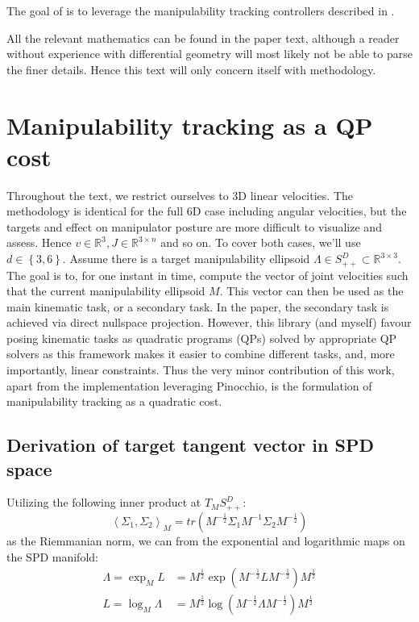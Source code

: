 \documentclass{article}
\begin{document}
The goal of is to leverage the manipulability tracking
controllers described in \cite{jaquier2018geometry}.

All the relevant mathematics can be found in the paper text, although a reader 
without experience with differential geometry
will most likely not be able to parse the finer details.
Hence this text will only concern itself with methodology.

\section{Manipulability tracking as a QP cost}
Throughout the text, we restrict ourselves to 3D linear velocities.
The methodology is identical for the full 6D case including angular velocities,
but the targets and effect on manipulator posture are more difficult to visualize and assess.
Hence $ v \in \mathbb{R}^{3}, J \in \mathbb{R}^{3 \times n}  $ and so on.
To cover both cases, we'll use $ d \in \left\{ 3,6 \right\}   $.
Assume there is a target manipulability ellipsoid $ \Lambda \in S^{ D }_{ ++ } \subset \mathbb{R}^{3 \times 3} $. 
The goal is to, for one instant in time, compute the vector of joint
velocities such that the current manipulability ellipsoid $ M  $.
This vector can then be used as the main kinematic task,
or a secondary task.
In the paper, the secondary task is achieved via direct nullspace projection.
However, this library (and myself) favour posing kinematic tasks
as quadratic programs (QPs) solved by appropriate QP solvers
as this framework makes it easier to combine different tasks,
and, more importantly, linear constraints.
Thus the very minor contribution of this work, apart from the implementation leveraging Pinocchio,
is the formulation of manipulability tracking as a quadratic cost.

\subsection{Derivation of target tangent vector in SPD space}
Utilizing the following inner product at $ T_{ M } S_{ ++ }^{ D }  $:
\begin{equation}
\left<\Sigma_{ 1 }, \Sigma_{ 2 } \right>_{ M }=
tr \left( 
M^{ -\frac{1}{2}  } \Sigma_{ 1 }
M^{ -1  } \Sigma_{ 2 }
M^{ -\frac{1}{2}  } 
\right) 
\end{equation}
as the Riemmanian norm, we can from the exponential and logarithmic maps
on the SPD manifold:
\begin{align}
\Lambda = \exp_{ M } L &=
M^{ \frac{1}{2}  } \exp (M^{ -\frac{1}{2}  }L M^{ -\frac{1}{2}  })M^{ \frac{1}{2}  }\\
L = \log_{ M } \Lambda &=
M^{ \frac{1}{2}  } \log (M^{ -\frac{1}{2}  }\Lambda M^{ -\frac{1}{2}  })M^{ \frac{1}{2}  }
\end{align}
\end{document}

